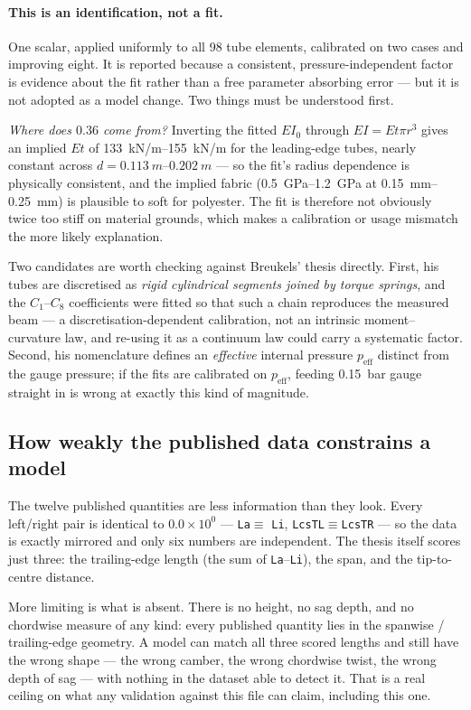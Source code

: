 \documentclass[11pt,a4paper]{article}
\begin{document}
\paragraph{This is an identification, not a fit.} One scalar, applied uniformly
to all 98 tube elements, calibrated on two cases and improving eight. It is
reported because a consistent, pressure-independent factor is evidence about the
fit rather than a free parameter absorbing error --- but it is not adopted as a
model change. Two things must be understood first.

\emph{Where does $0.36$ come from?} Inverting the fitted $EI_0$ through
$EI = E t \pi r^3$ gives an implied $E t$ of \SIrange{133}{155}{kN/m} for the
leading-edge tubes, nearly constant across $d = \SIrange{0.113}{0.202}{m}$ ---
so the fit's radius dependence is physically consistent, and the implied fabric
(\SIrange{0.5}{1.2}{GPa} at \SIrange{0.15}{0.25}{mm}) is plausible to soft for
polyester. The fit is therefore not obviously twice too stiff on material
grounds, which makes a calibration or usage mismatch the more likely
explanation.

Two candidates are worth checking against Breukels' thesis directly. First, his
tubes are discretised as \emph{rigid cylindrical segments joined by torque
springs}, and the $C_1$--$C_8$ coefficients were fitted so that such a chain
reproduces the measured beam --- a discretisation-dependent calibration, not an
intrinsic moment--curvature law, and re-using it as a continuum law could carry
a systematic factor. Second, his nomenclature defines an \emph{effective}
internal pressure $p_\text{eff}$ distinct from the gauge pressure; if the fits
are calibrated on $p_\text{eff}$, feeding \SI{0.15}{bar} gauge straight in is
wrong at exactly this kind of magnitude.

\subsection{How weakly the published data constrains a model}

The twelve published quantities are less information than they look. Every
left/right pair is identical to $0.0\times10^{0}$ --- \texttt{La}$\equiv$%
\texttt{Li}, \texttt{LcsTL}$\equiv$\texttt{LcsTR} --- so the data is exactly
mirrored and only six numbers are independent. The thesis itself scores just
three: the trailing-edge length (the sum of \texttt{La}--\texttt{Li}), the span,
and the tip-to-centre distance.

More limiting is what is absent. There is no height, no sag depth, and no
chordwise measure of any kind: every published quantity lies in the spanwise /
trailing-edge geometry. A model can match all three scored lengths and still
have the wrong shape --- the wrong camber, the wrong chordwise twist, the wrong
depth of sag --- with nothing in the dataset able to detect it. That is a real
ceiling on what any validation against this file can claim, including this one.
\end{document}
